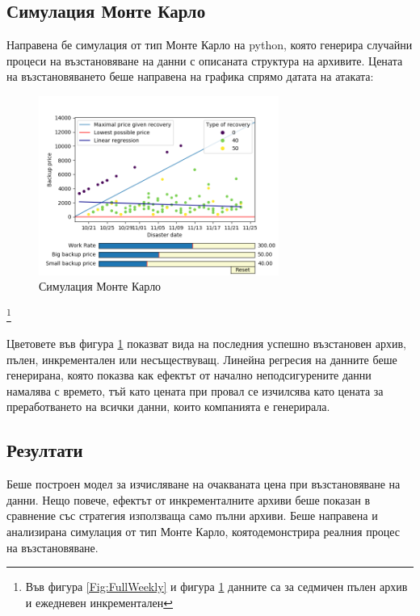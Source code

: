 \documentclass[11pt, a4paper]{article}
\theoremstyle{definition}
\newcommand\blfootnote[1]{%
	\begingroup
	\renewcommand\thefootnote{}\footnote{#1}%
	\addtocounter{footnote}{-1}%
	\endgroup
}
\begin{document}
		\subsection{Симулация Монте Карло}
			Направена бе симулация от тип Монте Карло на python, която генерира случайни процеси на възстановяване на данни с описаната структура на архивите. Цената на възстановяването беше направена на графика спрямо датата на атаката:
			\begin{figure}[H]
				\begin{minipage}{1.0\textwidth}
					\centering
					\includegraphics[width=0.7\textwidth]{Weekly_full_carlo.png}
					\caption{Симулация Монте Карло}\label{Fig:MonteCarlo}
				\end{minipage}
			\end{figure}
			\blfootnote{Във фигура \ref{Fig:FullWeekly} и фигура \ref{Fig:MonteCarlo} данните са за седмичен пълен архив и ежедневен инкрементален}
			Цветовете във фигура \ref{Fig:MonteCarlo} показват вида на последния успешно възстановен архив, пълен, инкрементален или несъществуващ.
			\newpage
			Линейна регресия на данните беше генерирана, която показва как ефектът от начално неподсигурените данни намалява с времето, тъй като цената при провал се изчилсява като цената за преработването на всички данни, които компанията е генерирала.
		\subsection{Резултати}
			Беше построен модел за изчисляване на очакваната цена при възстановяване на данни. Нещо повече, ефектът от инкременталните архиви беше показан в сравнение със стратегия използваща само пълни архиви. Беше направена и анализирана симулация от тип Монте Карло, коятодемонстрира реалния процес на възстановяване.
\end{document}
